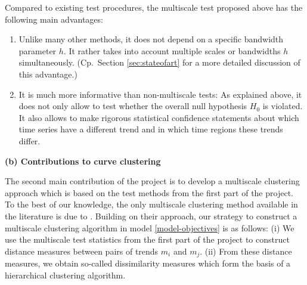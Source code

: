 \documentclass[a4paper,12pt]{article}
\begin{document}
Compared to existing test procedures, the multiscale test proposed above has the following main advantages: 
\begin{enumerate}[label=(\roman*),leftmargin=0.75cm]
\item Unlike many other methods, it does not depend on a specific bandwidth para\-meter $h$. It rather takes into account multiple scales or bandwidths $h$ simultaneously. (Cp.\ Section \ref{sec:stateofart} for a more detailed discussion of this advantage.)
\item It is much more informative than non-multiscale tests: As explained above, it does not only allow to test whether the overall null hypothesis $H_0$ is violated. It also allows to make rigorous statistical confidence statements about which time series have a different trend and in which time regions these trends differ. 
\end{enumerate}
\vspace{5pt}


\noindent \textbf{(b) Contributions to curve clustering} 
\vspace{10pt} 


\noindent The second main contribution of the project is to develop a multiscale clustering approach which is based on the test methods from the first part of the project. 
To the best of our knowledge, the only multiscale clustering method available in the literature is due to \cite{VogtLinton2018}. Building on their approach, our strategy to construct a multiscale clustering algorithm in model \eqref{model-objectives} is as follows: (i) We use the multiscale test statistics from the first part of the project to construct distance measures between pairs of trends $m_i$ and $m_j$. (ii) From these distance measures, we obtain so-called dissimilarity measures which form the basis of a hierarchical clustering algorithm. 
\end{document}
